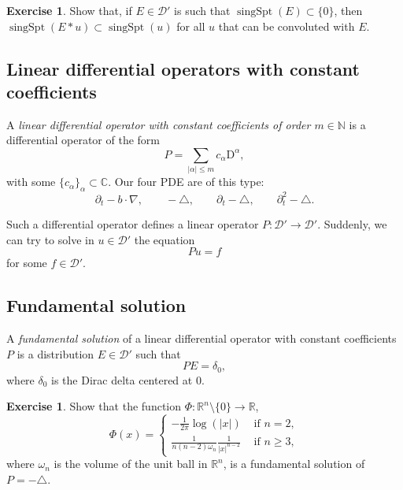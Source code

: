 \documentclass[a4paper,9pt]{amsart}
\newcommand{\scr}[1]{\mathscr{#1}}
\newcommand{\N}{\mathbb{N}}	%
\newcommand{\R}{\mathbb{R}}	%
\newcommand{\C}{\mathbb{C}}	%
\newcommand{\de}{\partial}		%
\newcommand{\Diff}{\mathrm{D}}
\newcommand{\laplacian}{\triangle}
\newcommand{\grad}{\nabla}
\newcommand{\singspt}{\operatorname{singSpt}}
\theoremstyle{plain}
\theoremstyle{definition}
\newtheorem{exercise}[proposition]{Exercise}%
\theoremstyle{remark}
\begin{document}
\begin{exercise}
	Show that, if $E\in\scr D'$ is such that $\singspt(E)\subset\{0\}$, then $\singspt(E*u) \subset \singspt(u)$ for all $u$ that can be convoluted with $E$.
\end{exercise}

\subsection{Linear differential operators with constant coefficients}
A \emph{linear differential operator with constant coefficients of order $m\in\N$}
is a differential operator of the form
\begin{equation}
	P = \sum_{|\alpha|\le m} c_\alpha \Diff^\alpha ,
\end{equation} 
with some $\{c_\alpha\}_{\alpha}\subset\C$.
Our four PDE are of this type:
\begin{equation}
	\de_t - b \cdot \grad,\qquad
	-\laplacian, \qquad
	\de_t-\laplacian, \qquad
	\de_t^2-\laplacian.
\end{equation}

Such a differential operator defines a linear operator $P:\scr D'\to\scr D'$.
Suddenly, we can try to solve in $u\in\scr D'$ the equation
\begin{equation}
	Pu = f
\end{equation}
for some $f\in\scr D'$.

\subsection{Fundamental solution}\label{subs6889d87f}
A \emph{fundamental solution} of a linear differential operator with constant coefficients $P$ is a distribution $E\in\scr D'$ such that
\begin{equation}
	PE = \delta_0 ,
\end{equation}
where $\delta_0$ is the Dirac delta centered at $0$.

\begin{exercise}
	Show that the function $\Phi:\R^n\setminus\{0\}\to\R$,
	\begin{equation}%
		\Phi(x) = 
		\begin{cases}
		-\frac{1}{2\pi} \log(|x|) & \text{ if }n=2 , \\
		\frac1{n(n-2)\omega_n } \frac1{|x|^{n-2}} & \text{ if }n\ge 3 ,
		\end{cases}
	\end{equation}
	where $\omega_n $ is the volume of the unit ball in $\R^n$,
	is a fundamental solution of $P=-\laplacian$.
\end{exercise}
\end{document}
